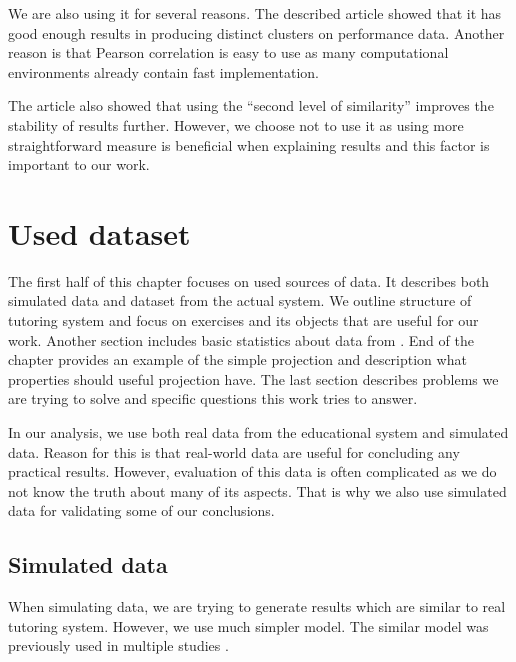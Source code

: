 \documentclass[
  digital, %
  table,   %
  nolof,     %
  nolot,     %
  nocover,
  color,
  final, %
]{fithesis3}
\begin{document}
We are also using it for several reasons. The described article showed that it has good enough results in producing distinct clusters on performance data. Another reason is that Pearson correlation is easy to use as many computational environments already contain fast implementation.

The article also showed that using the ``second level of similarity'' improves the stability of results further. However, we choose not to use it as using more straightforward measure is beneficial when explaining results and this factor is important to our work.


\chapter{Used dataset}\label{used-dataset}

The first half of this chapter focuses on used sources of data. It describes both simulated data and dataset from the actual system. We outline structure of tutoring system and focus on exercises and its objects that are useful for our work. Another section includes basic statistics about data from \umimeCesky{}. End of the chapter provides an example of the simple projection and description what properties should useful projection have. The last section describes problems we are trying to solve and specific questions this work tries to answer.


In our analysis, we use both real data from the educational system and simulated data. Reason for this is that real-world data are useful for concluding any practical results. However, evaluation of this data is often complicated as we do not know the truth about many of its aspects. That is why we also use simulated data for validating some of our conclusions.


\section{Simulated data}\label{simulated-data}

When simulating data, we are trying to generate results which are similar to real tutoring system. However, we use much simpler model. The similar model was previously used in multiple studies \cite{piech2015deep, pelanek2017measuring}.
\end{document}
